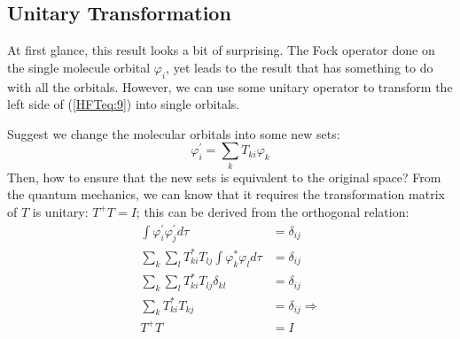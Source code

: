 \subsection{Unitary Transformation}\label{HFT:3}
%
%
%
At first glance, this result looks a bit of surprising. The Fock
operator done on the single molecule orbital $\varphi_{i}$, yet
leads to the result that has something to do with all the orbitals. However, we
can use some unitary operator  to transform the left side of (\ref{HFTeq:9})
into single orbitals.

Suggest we change the molecular orbitals into some new sets:
\begin{equation}\label{HFTeq:30}
\varphi_{i}^{'} = \sum_{k}T_{ki}\varphi_{k}
\end{equation}
Then, how to ensure that the new sets is equivalent to the 
original space? From the quantum mechanics, we can know that it
requires the transformation matrix of $T$ is unitary: $T^{+}T = I$;
this can be derived from the orthogonal relation:
\begin{align}\label{HFTeq:32}
\int\varphi_{i}^{'}\varphi_{j}^{'}d\tau &= \delta_{ij} \nonumber \\
\sum_{k}\sum_{l}T^{*}_{ki}T_{lj}\int\varphi^{*}_{k}\varphi_{l}d\tau
&= \delta_{ij} \nonumber \\
\sum_{k}\sum_{l}T^{*}_{ki}T_{lj}\delta_{kl}
&= \delta_{ij} \nonumber \\
\sum_{k}T^{*}_{ki}T_{kj}
&= \delta_{ij} \Rightarrow \nonumber \\
T^{+}T &= I
\end{align}

